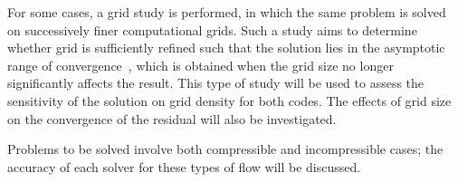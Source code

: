 For some cases, a grid study is performed, in which the same problem is solved on successively finer computational grids. Such a study aims to determine whether grid is sufficiently refined such that the solution lies in the asymptotic range of convergence~\cite{roache1986editorial}, which is obtained when the grid size no longer significantly affects the result. This type of study will be used to assess the sensitivity of the solution on grid density for both codes. The effects of grid size on the convergence of the residual will also be investigated.

Problems to be solved involve both compressible and incompressible cases; the accuracy of each solver for these types of flow will be discussed.

